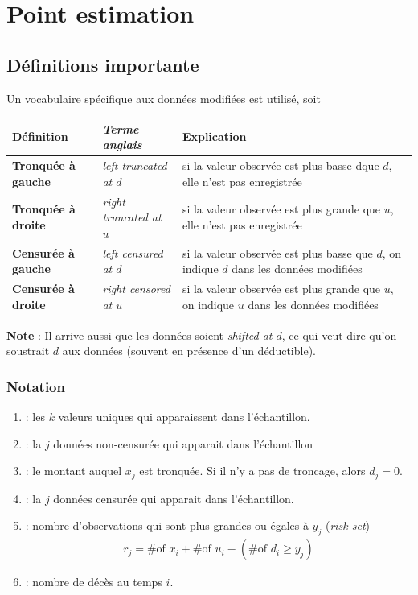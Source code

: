\documentclass[12pt, french]{report}
\begin{document}
\section{Point estimation}
\subsection{Définitions importante}
Un vocabulaire spécifique aux données modifiées est utilisé, soit

\begin{tabular}{|>{\bfseries} l |>{\em}l |p{3cm}|}
\hline
Définition	& Terme anglais & Explication \\
\hline	\hline
Tronquée à gauche	& left truncated at $d$ & si la valeur observée est plus basse dque $d$, elle n'est pas enregistrée \\
Tronquée à droite	& right truncated at $u$ & si la valeur observée est plus grande que $u$, elle n'est pas enregistrée \\
Censurée à gauche & left censured at $d$ & si la valeur observée est plus basse que $d$, on indique $d$ dans les données modifiées \\
Censurée à droite & right censored at $u$ & si la valeur observée est plus grande que $u$, on indique $u$ dans les données modifiées \\
\hline
\end{tabular}

\textbf{Note} : Il arrive aussi que les données soient \emph{shifted at $d$}, ce qui veut dire qu'on soustrait $d$ aux données (souvent en présence d'un déductible). 

\subsubsection{Notation}
\begin{enumerate}[label=\faAngleRight]
\item {} : les $k$ valeurs uniques qui apparaissent dans l'échantillon.

\item {} : la $j$ données non-censurée qui apparait dans l'échantillon

\item {} : le montant auquel $x_j$ est tronquée. Si il n'y a pas de troncage, alors $d_j = 0$.

\item {} : la $j$  données censurée qui apparait dans l'échantillon.

\item {} : nombre d'observations qui sont plus grandes ou égales à $y_j$ (\emph{risk set})
\begin{align*}
r_j = \text{\# of $x_i$} + \text{\# of $u_i$} - (\text{\# of $d_i$} \geq y_j)
\end{align*}

\item {} : nombre de décès au temps $i$.
\end{enumerate}
\end{document}
